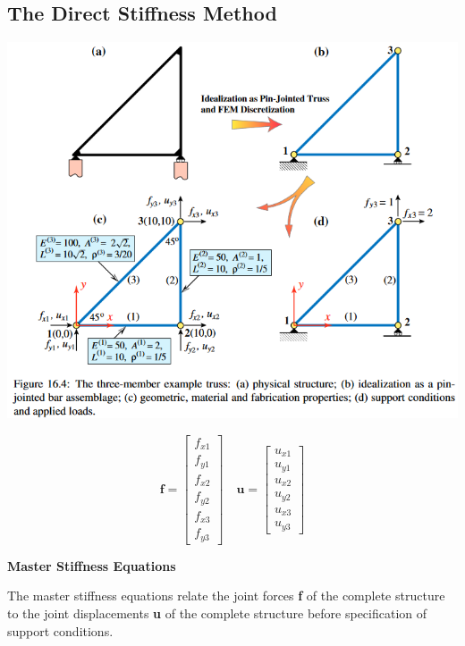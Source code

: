 \documentclass{article}
\begin{document}
\begin{multicols*}{2}
    \section*{The Direct Stiffness Method}\par 
    \includegraphics[width=\linewidth]{Figures/DSM1_Example.png}

    \begin{equation*}
        \textbf{f} = 
        \begin{bmatrix}
            f_{x1}\\
            f_{y1}\\
            f_{x2}\\
            f_{y2}\\
            f_{x3}\\
            f_{y3}
        \end{bmatrix}
        \quad
        \textbf{u} = 
        \begin{bmatrix}
            u_{x1}\\
            u_{y1}\\
            u_{x2}\\
            u_{y2}\\
            u_{x3}\\
            u_{y3}
        \end{bmatrix}
    \end{equation*}

    \textbf{Master Stiffness Equations}\par 
    The master stiffness equations relate the joint forces \textbf{f} of the
    complete structure to the joint displacements \textbf{u} of the complete
    structure before specification of support conditions.


\end{multicols*}
\end{document}
